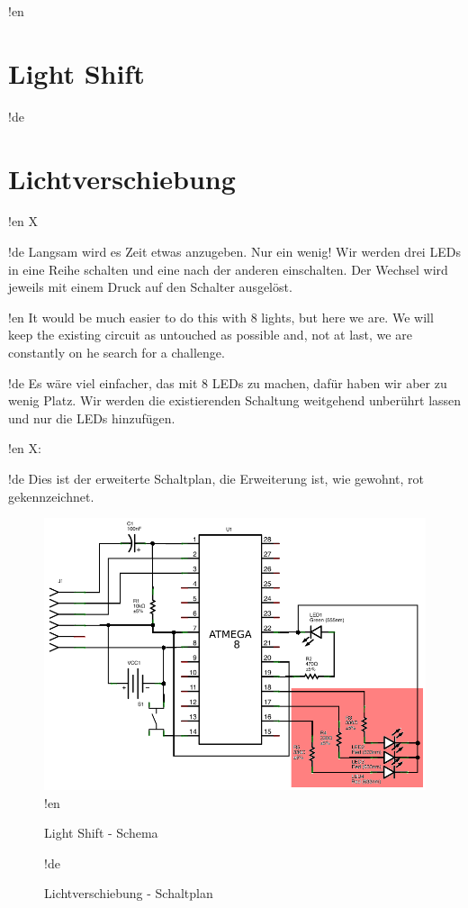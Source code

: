 !en \section{Light Shift}
!de \section{Lichtverschiebung}

!en X

!de Langsam wird es Zeit etwas anzugeben. Nur ein wenig! Wir werden drei LEDs in eine Reihe schalten und eine nach der anderen einschalten. Der Wechsel wird jeweils mit einem Druck auf den Schalter ausgelöst.



!en It would be much easier to do this with 8 lights, but here we are. We will keep the existing circuit as untouched as possible and, not at last, we are constantly on he search for a challenge.

!de Es wäre viel einfacher, das mit 8 LEDs zu machen, dafür haben wir aber zu wenig Platz. Wir werden die existierenden Schaltung weitgehend unberührt lassen und nur die LEDs hinzufügen.


!en X:

!de Dies ist der erweiterte Schaltplan, die Erweiterung ist, wie gewohnt, rot gekennzeichnet.

\begin{figure}[htbp]
  \centering
  \includegraphics[width=120mm]{LED/S010_light-shift_Circuit_schema.png}
!en   \caption{Light Shift - Schema}
!de   \caption{Lichtverschiebung - Schaltplan}
  \label{atmega8-light-shift-schema}
\end{figure}



